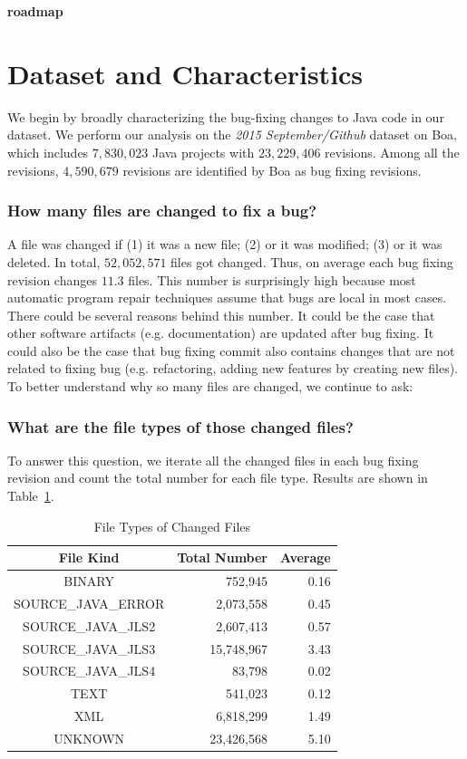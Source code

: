 \documentclass{sig-alternate-05-2015}
\newcommand{\todo}[1]
  {{\scriptsize \textbf{\color{red} {#1}}}}
\begin{document}
\todo{roadmap}

\section{Dataset and Characteristics}

We begin by broadly characterizing the bug-fixing changes to Java code in our
dataset.  We perform our analysis on the \emph{2015 September/Github} dataset on
Boa, which includes $7,830,023$ Java projects with $23,229,406$ revisions. Among
all the revisions, $4,590,679$ revisions are identified by Boa as bug fixing
revisions.

\subsubsection*{How many files are changed to fix a bug?} \vspace{-0.3em} 

A file was changed if (1) it was a new file; (2) or it was modified; (3) or it
was deleted. In total, $52,052,571$ files got changed. Thus, on average each bug
fixing revision changes $11.3$ files.  This number is surprisingly high because
most automatic program repair techniques assume that bugs are local in most
cases. There could be several reasons behind this number. It could be the case
that other software artifacts (e.g.  documentation) are updated after bug
fixing. It could also be the case that bug fixing commit also contains changes
that are not related to fixing bug (e.g. refactoring, adding new features by
creating new files). To better understand why so many files are changed, we
continue to ask:

\subsubsection*{What are the file types of those changed files?} \vspace{-0.3em}

To answer this question, we iterate all the changed files in each bug fixing
revision and count the total number for each file type. Results are shown in
Table~\ref{tbl:fileType}.

\begin{table}
\centering
  \begin{tabular}{| c | r | r |}
  \hline
  File Kind & Total Number & Average \\ \hline \hline
  BINARY & 752,945 & 0.16 \\ \hline
  SOURCE\_JAVA\_ERROR & 2,073,558 & 0.45 \\ \hline
  SOURCE\_JAVA\_JLS2 & 2,607,413 & 0.57 \\ \hline
  SOURCE\_JAVA\_JLS3 & 15,748,967 & 3.43 \\ \hline
  SOURCE\_JAVA\_JLS4 & 83,798 & 0.02 \\ \hline
  TEXT & 541,023 & 0.12 \\ \hline
  XML & 6,818,299 & 1.49 \\ \hline
  UNKNOWN & 23,426,568 & 5.10 \\ \hline
  \end{tabular}
  \caption{File Types of Changed Files}
  \label{tbl:fileType}
\end{table}
\end{document}
